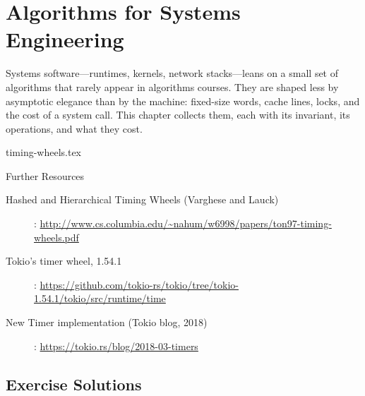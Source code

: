 \chapter{Algorithms for Systems Engineering}
\label{ch:systems-algorithms}

Systems software---runtimes, kernels, network stacks---leans on a small set of algorithms that rarely appear in algorithms courses. They are shaped less by asymptotic elegance than by the machine: fixed-size words, cache lines, locks, and the cost of a system call. This chapter collects them, each with its invariant, its operations, and what they cost.

{timing-wheels.tex}

\begin{refbox}{Further Resources}
    \small
    \begin{description}
        \item [Hashed and Hierarchical Timing Wheels (Varghese and Lauck)]: \href{http://www.cs.columbia.edu/~nahum/w6998/papers/ton97-timing-wheels.pdf}{http://www.cs.columbia.edu/\textasciitilde nahum/w6998/papers/ton97-timing-wheels.pdf}
        \item [Tokio's timer wheel, 1.54.1]: \href{https://github.com/tokio-rs/tokio/tree/tokio-1.54.1/tokio/src/runtime/time}{https://github.com/tokio-rs/tokio/tree/tokio-1.54.1/tokio/src/runtime/time}
        \item [New Timer implementation (Tokio blog, 2018)]: \href{https://tokio.rs/blog/2018-03-timers}{https://tokio.rs/blog/2018-03-timers}
    \end{description}
\end{refbox}

\section{Exercise Solutions}
\shipoutAnswer
